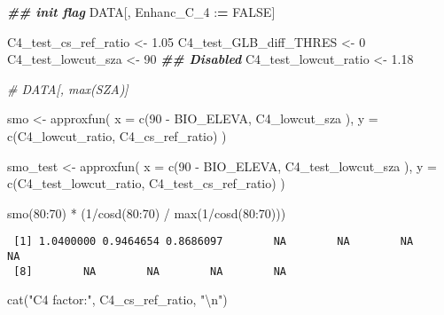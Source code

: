 \documentclass[
  10pt,
  a4paper,oneside]{article}
\newenvironment{Shaded}{\begin{snugshade}}{\end{snugshade}}
\newcommand{\AttributeTok}[1]{\textcolor[rgb]{0.77,0.63,0.00}{#1}}
\newcommand{\CommentTok}[1]{\textcolor[rgb]{0.56,0.35,0.01}{\textit{#1}}}
\newcommand{\ConstantTok}[1]{\textcolor[rgb]{0.00,0.00,0.00}{#1}}
\newcommand{\DecValTok}[1]{\textcolor[rgb]{0.00,0.00,0.81}{#1}}
\newcommand{\DocumentationTok}[1]{\textcolor[rgb]{0.56,0.35,0.01}{\textbf{\textit{#1}}}}
\newcommand{\ErrorTok}[1]{\textcolor[rgb]{0.64,0.00,0.00}{\textbf{#1}}}
\newcommand{\FloatTok}[1]{\textcolor[rgb]{0.00,0.00,0.81}{#1}}
\newcommand{\FunctionTok}[1]{\textcolor[rgb]{0.00,0.00,0.00}{#1}}
\newcommand{\NormalTok}[1]{#1}
\newcommand{\OtherTok}[1]{\textcolor[rgb]{0.56,0.35,0.01}{#1}}
\newcommand{\SpecialCharTok}[1]{\textcolor[rgb]{0.00,0.00,0.00}{#1}}
\newcommand{\StringTok}[1]{\textcolor[rgb]{0.31,0.60,0.02}{#1}}
\begin{document}
\begin{Shaded}
\begin{Highlighting}[]
\DocumentationTok{\#\# init flag}
\NormalTok{DATA[, Enhanc\_C\_4 }\SpecialCharTok{:}\ErrorTok{=} \ConstantTok{FALSE}\NormalTok{]}

\NormalTok{C4\_test\_cs\_ref\_ratio   }\OtherTok{\textless{}{-}}  \FloatTok{1.05}
\NormalTok{C4\_test\_GLB\_diff\_THRES }\OtherTok{\textless{}{-}}  \DecValTok{0}
\NormalTok{C4\_test\_lowcut\_sza     }\OtherTok{\textless{}{-}} \DecValTok{90}  \DocumentationTok{\#\# Disabled}
\NormalTok{C4\_test\_lowcut\_ratio   }\OtherTok{\textless{}{-}}  \FloatTok{1.18}

\CommentTok{\# DATA[, max(SZA)]}

\NormalTok{smo }\OtherTok{\textless{}{-}} \FunctionTok{approxfun}\NormalTok{(}
  \AttributeTok{x =} \FunctionTok{c}\NormalTok{(}\DecValTok{90} \SpecialCharTok{{-}}\NormalTok{ BIO\_ELEVA,  C4\_lowcut\_sza  ),}
  \AttributeTok{y =} \FunctionTok{c}\NormalTok{(C4\_lowcut\_ratio, C4\_cs\_ref\_ratio)}
\NormalTok{)}

\NormalTok{smo\_test }\OtherTok{\textless{}{-}} \FunctionTok{approxfun}\NormalTok{(}
  \AttributeTok{x =} \FunctionTok{c}\NormalTok{(}\DecValTok{90} \SpecialCharTok{{-}}\NormalTok{ BIO\_ELEVA,       C4\_test\_lowcut\_sza  ),}
  \AttributeTok{y =} \FunctionTok{c}\NormalTok{(C4\_test\_lowcut\_ratio, C4\_test\_cs\_ref\_ratio)}
\NormalTok{)}

\FunctionTok{smo}\NormalTok{(}\DecValTok{80}\SpecialCharTok{:}\DecValTok{70}\NormalTok{) }\SpecialCharTok{*}\NormalTok{ (}\DecValTok{1}\SpecialCharTok{/}\FunctionTok{cosd}\NormalTok{(}\DecValTok{80}\SpecialCharTok{:}\DecValTok{70}\NormalTok{) }\SpecialCharTok{/} \FunctionTok{max}\NormalTok{(}\DecValTok{1}\SpecialCharTok{/}\FunctionTok{cosd}\NormalTok{(}\DecValTok{80}\SpecialCharTok{:}\DecValTok{70}\NormalTok{)))}
\end{Highlighting}
\end{Shaded}

\begin{verbatim}
 [1] 1.0400000 0.9464654 0.8686097        NA        NA        NA        NA
 [8]        NA        NA        NA        NA
\end{verbatim}

\begin{Shaded}
\begin{Highlighting}[]
\FunctionTok{cat}\NormalTok{(}\StringTok{"C4 factor:"}\NormalTok{, C4\_cs\_ref\_ratio,   }\StringTok{"}\SpecialCharTok{\textbackslash{}n}\StringTok{"}\NormalTok{)}
\end{Highlighting}
\end{Shaded}
\end{document}
